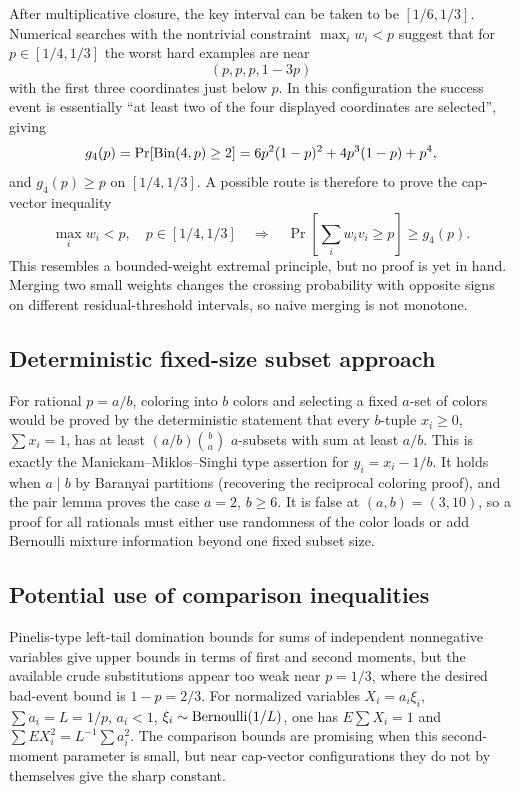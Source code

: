 \documentclass[12pt]{article}
\begin{document}
After multiplicative closure, the key interval can be taken to be
\([1/6,1/3]\).  Numerical searches with the nontrivial constraint
\(\max_i w_i<p\) suggest that for \(p\in[1/4,1/3]\) the worst hard examples are
near
\[
        (p,p,p,1-3p)
\]
with the first three coordinates just below \(p\).  In this configuration the
success event is essentially ``at least two of the four displayed coordinates
are selected'', giving
\[
        g_4(p)=\Pr[{\rm Bin}(4,p)\ge2]
        =6p^2(1-p)^2+4p^3(1-p)+p^4,
\]
and \(g_4(p)\ge p\) on \([1/4,1/3]\).  A possible route is therefore to prove
the cap-vector inequality
\[
        \max_i w_i<p,\quad p\in[1/4,1/3]
        \quad\Longrightarrow\quad
        \Pr\!\left[\sum_i w_i v_i\ge p\right]\ge g_4(p).
\]
This resembles a bounded-weight extremal principle, but no proof is yet in
hand.  Merging two small weights changes the crossing probability with opposite
signs on different residual-threshold intervals, so naive merging is not
monotone.

\subsection*{Deterministic fixed-size subset approach}

For rational \(p=a/b\), coloring into \(b\) colors and selecting a fixed
\(a\)-set of colors would be proved by the deterministic statement that every
\(b\)-tuple \(x_i\ge0\), \(\sum x_i=1\), has at least
\((a/b)\binom ba\) \(a\)-subsets with sum at least \(a/b\).  This is exactly the
Manickam--Miklos--Singhi type assertion for \(y_i=x_i-1/b\).  It holds when
\(a\mid b\) by Baranyai partitions (recovering the reciprocal coloring proof),
and the pair lemma proves the case \(a=2\), \(b\ge6\).  It is false at
\((a,b)=(3,10)\), so a proof for all rationals must either use randomness of the
color loads or add Bernoulli mixture information beyond one fixed subset size.

\subsection*{Potential use of comparison inequalities}

Pinelis-type left-tail domination bounds for sums of independent nonnegative
variables give upper bounds in terms of first and second moments, but the
available crude substitutions appear too weak near \(p=1/3\), where the desired
bad-event bound is \(1-p=2/3\).  For normalized variables
\(X_i=a_i\xi_i\), \(\sum a_i=L=1/p\), \(a_i<1\), \(\xi_i\sim{\rm Bernoulli}(1/L)\),
one has \(E\sum X_i=1\) and \(\sum E X_i^2=L^{-1}\sum a_i^2\).  The comparison
bounds are promising when this second-moment parameter is small, but near
cap-vector configurations they do not by themselves give the sharp constant.
\end{document}
